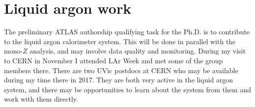 \section{Liquid argon work}
\label{sec:LAr}

The preliminary ATLAS authorship qualifying task for the Ph.D. is to contribute to the liquid argon calorimeter system. This will be done in parallel with the mono-$Z$ analysis, and may involve data quality and monitoring. During my visit to CERN in November I attended LAr Week and met some of the group members there. There are two UVic postdocs at CERN who may be available during my time there in 2017. They are both very active in the liquid argon system, and there may be opportunities to learn about the system from them and work with them directly.